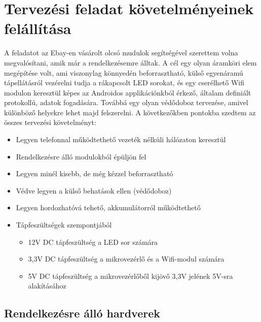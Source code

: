 \documentclass[../main.tex]{subfiles}
\begin{document}
\section{Tervezési feladat követelményeinek felállítása}
    A feladatot az Ebay-en vásárolt olcsó mudulok segítségével szerettem volna megvalósítani, amik már a rendelkezésemre álltak. A cél egy olyan áramköri elem megépítése volt, ami viszonylag könnyedén beforrasztható, külső egyenáramú tápellátásról vezérelni tudja a rákapcsolt LED sorokat, és egy cserélhető Wifi modulon keresztül képes az Androidos applikációnkból érkező, általam definiált protokollú, adatok fogadására. Továbbá egy olyan védődoboz tervezése, amivel különböző helyekre lehet majd felszerelni. A következőkben pontokba szedtem az összes tervezési követelményt:
 
        \begin{itemize}
            \item Legyen telefonnal működtethető vezeték nélküli hálózaton keresztül
            \item Rendelkezésre álló modulokból épüljön fel
            \item Legyen minél kisebb, de még kézzel beforrasztható
            \item Védve legyen a külső behatások ellen (védődoboz)
            \item Legyen hordozhatóvá tehető, akkumulátorról működtethető
            \item Tápfeszültségek szempontjából
                 \begin{itemize}
                    \item 12V DC tápfeszültség a LED sor számára
                    \item 3,3V DC tápfeszültség a mikrovezérlő és a Wifi-modul számára
                    \item 5V DC tápfeszültség a mikrovezérlőből kijövő 3,3V jelének 5V-sra alakításához
                \end{itemize}
        \end{itemize}
    
    
    \subsection{Rendelkezésre álló hardverek}
\end{document}
